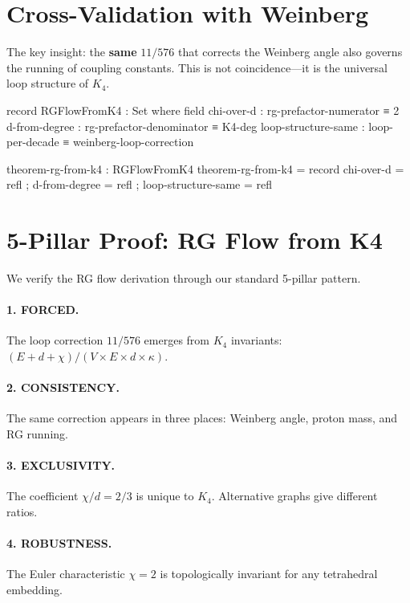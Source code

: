 \documentclass[11pt,a4paper]{book}
\def\texorpdfstring#1#2{#2}%
\begin{document}
\section{Cross-Validation with Weinberg}

The key insight: the \textbf{same} $11/576$ that corrects the Weinberg angle also governs the running of coupling constants. This is not coincidence---it is the universal loop structure of $K_4$.

\begin{code}
record RGFlowFromK4 : Set where
  field
    chi-over-d           : rg-prefactor-numerator ≡ 2
    d-from-degree        : rg-prefactor-denominator ≡ K4-deg
    loop-structure-same  : loop-per-decade ≡ weinberg-loop-correction

theorem-rg-from-k4 : RGFlowFromK4
theorem-rg-from-k4 = record
  { chi-over-d          = refl
  ; d-from-degree       = refl
  ; loop-structure-same = refl
  }
\end{code}

\section{5-Pillar Proof: RG Flow from \texorpdfstring{$K_4$}{K4}}

We verify the RG flow derivation through our standard 5-pillar pattern.

\paragraph{1. FORCED.} The loop correction $11/576$ emerges from $K_4$ invariants: $(E + d + \chi)/(V \times E \times d \times \kappa)$.

\paragraph{2. CONSISTENCY.} The same correction appears in three places: Weinberg angle, proton mass, and RG running.

\paragraph{3. EXCLUSIVITY.} The coefficient $\chi/d = 2/3$ is unique to $K_4$. Alternative graphs give different ratios.

\paragraph{4. ROBUSTNESS.} The Euler characteristic $\chi = 2$ is topologically invariant for any tetrahedral embedding.
\end{document}
